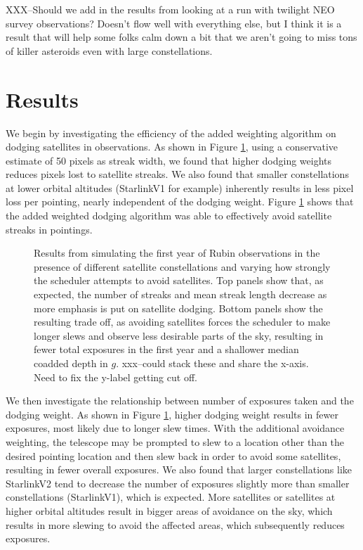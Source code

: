 \documentclass[linenumbers]{aastex631}
\begin{document}
XXX--Should we add in the results from looking at a run with twilight NEO survey observations? Doesn't flow well with everything else, but I think it is a result that will help some folks calm down a bit that we aren't going to miss tons of killer asteroids even with large constellations.

\section{Results}
We begin by investigating the efficiency of the added weighting algorithm on dodging
satellites in observations. As shown in Figure \ref{fig-pixel-loss-weight}, using a conservative estimate of 50 pixels as
streak width, we found that higher dodging weights reduces pixels lost to satellite streaks. We
also found that smaller constellations at lower orbital altitudes (StarlinkV1 for example)
inherently results in less pixel loss per pointing, nearly independent of the dodging weight.
Figure \ref{fig-pixel-loss-weight} shows that the added weighted dodging algorithm was able to effectively avoid satellite streaks in pointings.

\begin{figure}[ht!]
\caption{Results from simulating the first year of Rubin observations in the presence of different satellite constellations and varying how strongly the scheduler attempts to avoid satellites.  Top panels show that, as expected, the number of streaks and mean streak length decrease as more emphasis is put on satellite dodging. Bottom panels show the resulting trade off, as avoiding satellites forces the scheduler to make longer slews and observe less desirable parts of the sky, resulting in fewer total exposures in the first year and a shallower median coadded depth in $g$.
xxx--could stack these and share the x-axis. Need to fix the y-label getting cut off.
\label{fig-pixel-loss-weight}}
\end{figure}

We then investigate the relationship between number of exposures taken and the dodging
weight. As shown in Figure \ref{fig-pixel-loss-weight}, higher dodging weight results in fewer exposures, most likely due
to longer slew times. With the additional avoidance weighting, the telescope may be prompted to
slew to a location other than the desired pointing location and then slew back in order to avoid
some satellites, resulting in fewer overall exposures. We also found that larger constellations like
StarlinkV2 tend to decrease the number of exposures slightly more than smaller constellations
(StarlinkV1), which is expected. More satellites or satellites at higher orbital altitudes result in
bigger areas of avoidance on the sky, which results in more slewing to avoid the affected areas,
which subsequently reduces exposures. \\
\end{document}
